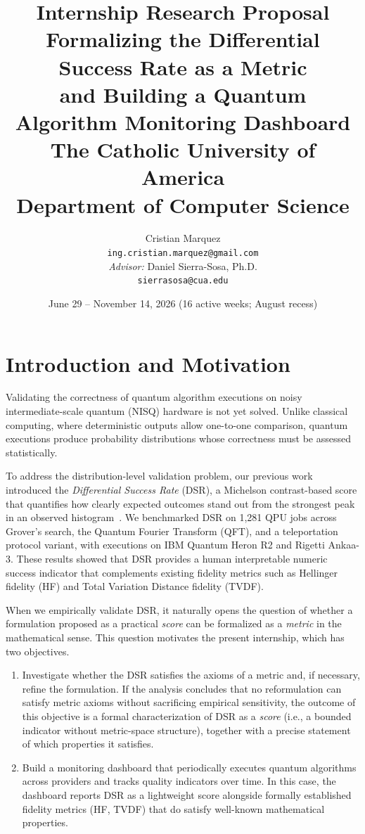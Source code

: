 \documentclass[11pt]{article}
\title{%
  \textbf{Internship Research Proposal}\\[0.3em]
  \large Formalizing the Differential Success Rate as a Metric\\
  and Building a Quantum Algorithm Monitoring Dashboard\\[1em]
  \normalsize The Catholic University of America\\
  Department of Computer Science
}
\author{
  Cristian Marquez\\
  \texttt{ing.cristian.marquez@gmail.com}\\[0.5em]
  \textit{Advisor:} Daniel Sierra-Sosa, Ph.D.\\
  \texttt{sierrasosa@cua.edu}
}
\date{June 29 -- November 14, 2026 \quad (16 active weeks; August recess)}
\begin{document}
\maketitle
\thispagestyle{fancy}

\clearpage

\tableofcontents
\newpage

\section{Introduction and Motivation}

Validating the correctness of quantum algorithm executions on noisy intermediate-scale quantum (NISQ) hardware is not yet solved. Unlike classical computing, where deterministic outputs allow one-to-one comparison, quantum executions produce probability distributions whose correctness must be assessed statistically.

To address the distribution-level validation problem, our previous work introduced the \emph{Differential Success Rate} (DSR), a Michelson contrast-based score that quantifies how clearly expected outcomes stand out from the strongest peak in an observed histogram~\cite{dsrPaper2026}. We benchmarked DSR on 1,281 QPU jobs across Grover's search, the Quantum Fourier Transform (QFT), and a teleportation protocol variant, with executions on IBM Quantum Heron R2 and Rigetti Ankaa-3. These results showed that DSR provides a human interpretable numeric success indicator that complements existing fidelity metrics such as Hellinger fidelity (HF) and Total Variation Distance fidelity (TVDF).

When we empirically validate DSR, it naturally opens the question of whether a formulation proposed as a practical \emph{score} can be formalized as a \emph{metric} in the mathematical sense. This question motivates the present internship, which has two objectives.
\begin{enumerate}[label=(\arabic*)]
  \item \label{obj:dsr-formalization} Investigate whether the DSR satisfies the axioms of a metric and, if necessary, refine the formulation. If the analysis concludes that no reformulation can satisfy metric axioms without sacrificing empirical sensitivity, the outcome of this objective is a formal characterization of DSR as a \emph{score} (i.e., a bounded indicator without metric-space structure), together with a precise statement of which properties it satisfies.
  \item \label{obj:monitoring-dashboard} Build a monitoring dashboard that periodically executes quantum algorithms across providers and tracks quality indicators over time. In this case, the dashboard reports DSR as a lightweight score alongside formally established fidelity metrics (HF, TVDF) that do satisfy well-known mathematical properties.
\end{enumerate}
\end{document}
